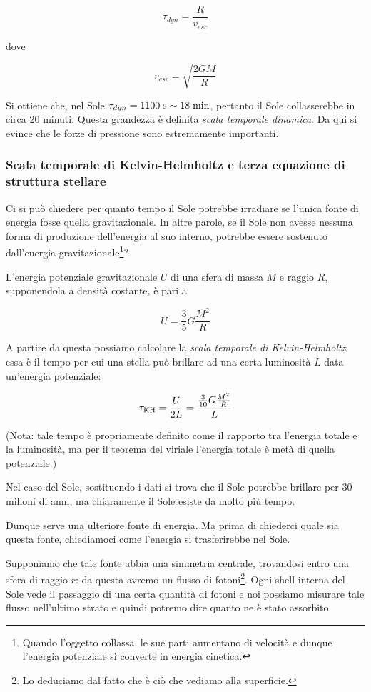 $$\tau_{dyn}=\frac{R}{v_{esc}}$$

dove

$$v_{esc}=\sqrt{\frac{2GM}{R}}$$

Si ottiene che, nel Sole $\tau_{dyn}=1100 \; \rm s\sim 18 \; min$, pertanto il Sole collasserebbe in circa 20 minuti. Questa grandezza è definita \textit{scala temporale dinamica}. Da qui si evince che le forze di pressione sono estremamente importanti. %

\subsubsection{Scala temporale di Kelvin-Helmholtz e terza equazione di struttura stellare}
Ci si può chiedere per quanto tempo il Sole potrebbe irradiare se l'unica fonte di energia fosse quella gravitazionale. In altre parole, se il Sole non avesse nessuna forma di produzione dell'energia al suo interno, potrebbe essere sostenuto dall'energia gravitazionale\footnote{Quando l'oggetto collassa, le sue parti aumentano di velocità e dunque l'energia potenziale si converte in energia cinetica.}?

L'energia potenziale gravitazionale $U$ di una sfera di massa $M$ e raggio $R$, supponendola a densità costante, è pari a

$$U=\frac{3}{5}G\frac{M^2}{R}$$

A partire da questa possiamo calcolare la \textit{scala temporale di Kelvin-Helmholtz}: essa è il tempo per cui una stella può brillare ad una certa luminosità $L$ data un'energia potenziale:

$$\tau_{\rm KH}=\frac{U}{2L}=\frac{\frac{3}{10}G\frac{M^2}{R}}{L}$$

(Nota: tale tempo è propriamente definito come il rapporto tra l'energia totale e la luminosità, ma per il teorema del viriale l'energia totale è metà di quella potenziale.)

Nel caso del Sole, sostituendo i dati si trova che il Sole potrebbe brillare per 30 milioni di anni, ma chiaramente il Sole esiste da molto più tempo.

Dunque serve una ulteriore fonte di energia. Ma prima di chiederci quale sia questa fonte, chiediamoci come l'energia si trasferirebbe nel Sole.

Supponiamo che tale fonte abbia una simmetria centrale, trovandosi entro una sfera di raggio $r$: da questa avremo un flusso di fotoni\footnote{Lo deduciamo dal fatto che è ciò che vediamo alla superficie.}. Ogni shell interna del Sole vede il passaggio di una certa quantità di fotoni e noi possiamo misurare tale flusso nell'ultimo strato e quindi potremo dire quanto ne è stato assorbito. 

